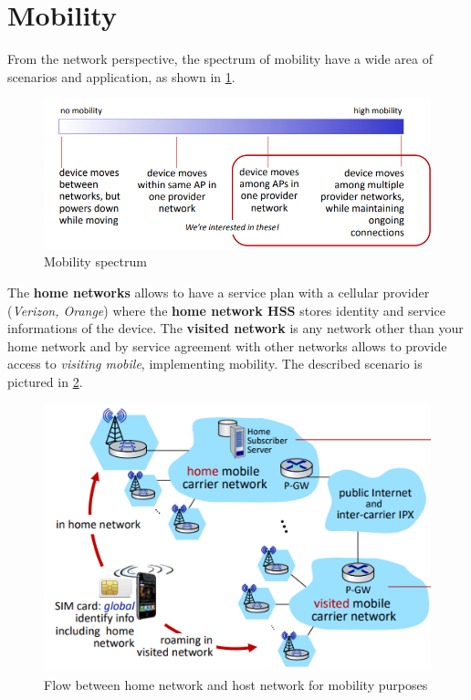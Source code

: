 \documentclass[10pt,a4paper]{report}
\theoremstyle{definition}
\begin{document}
\section{Mobility}\label{sec:mobility}
From the network perspective, the spectrum of mobility have a wide area of scenarios and application, as shown in \ref{mobility-scenario}.
\begin{figure}[h]
	\centering\includegraphics[scale=0.50]{images/Pasted image 20230308173344.png}
	\caption{Mobility spectrum}
	\label{mobility-scenario}
\end{figure}


The \textbf{home networks} allows to have a service plan with a cellular provider (\textit{Verizon, Orange}) where the \textbf{home network HSS} stores identity and service informations of the device. The \textbf{visited network} is any network other than your home network and by service agreement with other networks allows to provide access to \textit{visiting mobile}, implementing mobility. The described scenario is pictured in \ref{mobility-network}.

\begin{figure}[h]
	\centering
	\includegraphics[scale=0.50]{images/Pasted image 20230309174849.png}
	\caption{Flow between home network and host network for mobility purposes}
	\label{mobility-network}
\end{figure}
\end{document}
